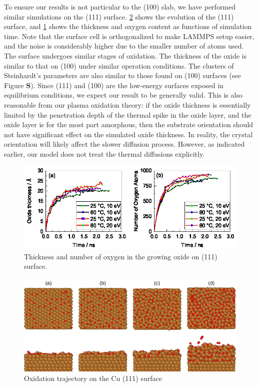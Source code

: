 \documentclass[manuscript=cmatex]{achemso}
\begin{document}
To ensure our results is not particular to the  (100) slab, we have performed similar simulations on the  (111) surface. \cref{fig:traj111} shows the evolution of the (111) surface, and \cref{fig:thicknumo_111} shows the thickness and oxygen content as functions of simulation time. Note that the surface cell is orthogonalized to make LAMMPS setup easier, and the noise is considerably higher due to the smaller number of atoms used. The surface undergoes similar stages of oxidation. The thickness of the oxide is similar to that on (100) under similar operation conditions. The clusters of Steinhardt's parameters are also similar to those found on (100) surfaces (see Figure \textbf{S}). Since (111) and (100) are the low-energy surfaces exposed in equilibrium conditions, we expect our result to be generally valid. This is also reasonable from our plasma oxidation theory: if the oxide thickness is essentially limited by the penetration depth of the thermal spike in the oxide layer, and the oxide layer is for the most part amorphous, then the substrate orientation should not have significant effect on the simulated oxide thickness. In reality, the crystal orientation will likely affect the slower diffusion process. However, as indicated earlier, our model does not treat the thermal diffusions explicitly. 

\begin{figure}[h]
  \centering
  \includegraphics[width=\textwidth]{thicknumo_111.eps}
  \caption[Steinhardt's order parameter for slab]{Thickness and number of oxygen in the growing oxide on  (111) surface. }
  \label{fig:thicknumo_111}
\end{figure}

\begin{figure}[h]
  \centering
  \includegraphics[width=\textwidth]{traj111}
  \caption[Oxidation trajectory on the Cu (111) surface]{Oxidation trajectory on the Cu (111) surface}
  \label{fig:traj111}
\end{figure}
\end{document}
